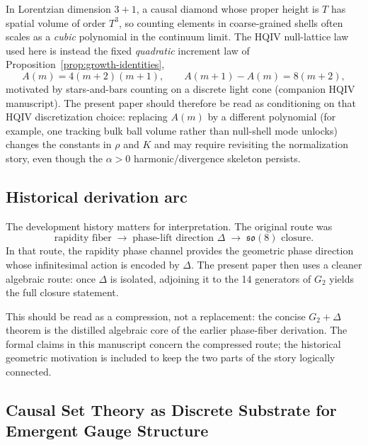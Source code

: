 \documentclass[11pt]{amsart}
\begin{document}
In Lorentzian dimension \(3+1\), a causal diamond whose proper height is \(T\) has spatial volume of order \(T^3\), so counting elements in coarse-grained shells often scales as a \emph{cubic} polynomial in the continuum limit. The HQIV null-lattice law used here is instead the fixed \emph{quadratic} increment law of Proposition~\ref{prop:growth-identities},
\[
A(m)=4(m+2)(m+1),\qquad A(m+1)-A(m)=8(m+2),
\]
motivated by stars-and-bars counting on a discrete light cone (companion HQIV manuscript). The present paper should therefore be read as conditioning on that HQIV discretization choice: replacing \(A(m)\) by a different polynomial (for example, one tracking bulk ball volume rather than null-shell mode unlocks) changes the constants in \(\rho\) and \(K\) and may require revisiting the normalization story, even though the \(\alpha>0\) harmonic/divergence skeleton persists.

\subsection*{Historical derivation arc}

The development history matters for interpretation. The original route was
\[
\text{rapidity fiber} \;\longrightarrow\; \text{phase-lift direction } \Delta \;\longrightarrow\; \mathfrak{so}(8)\text{ closure}.
\]
In that route, the rapidity phase channel provides the geometric phase direction whose infinitesimal action is encoded by \(\Delta\). The present paper then uses a cleaner algebraic route: once \(\Delta\) is isolated, adjoining it to the 14 generators of \(G_2\) yields the full closure statement.

This should be read as a compression, not a replacement: the concise \(G_2+\Delta\) theorem is the distilled algebraic core of the earlier phase-fiber derivation. The formal claims in this manuscript concern the compressed route; the historical geometric motivation is included to keep the two parts of the story logically connected.

\subsection*{Causal Set Theory as Discrete Substrate for Emergent Gauge Structure}
\end{document}
